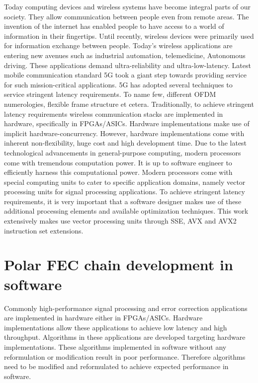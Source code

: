 Today computing devices and wireless systems have become integral parts of our society. They allow communication between people even from remote areas. The invention of the internet has enabled people to have access to a world of information in their fingertips. Until recently, wireless devices were primarily used for information exchange between people. Today's wireless applications are entering new avenues such as industrial automation, telemedicine, Autonomous driving. These applications demand ultra-reliability and ultra-low-latency. Latest mobile communication standard 5G took a giant step towards providing service for such mission-critical applications. 5G has adopted several techniques to service stringent latency requirements. To name few, different OFDM numerologies, flexible frame structure et cetera. Traditionally, to achieve stringent latency requirements wireless communication stacks are implemented in hardware, specifically in FPGAs/ASICs. Hardware implementations make use of implicit hardware-concurrency. However, hardware implementations come with inherent non-flexibility, huge cost and high development time. Due to the latest technological advancements in general-purpose computing, modern processors come with tremendous computation power. It is up to software engineer to efficiently harness this computational power. Modern processors come with special computing units to cater to specific application domains, namely vector processing units for signal processing applications. To achieve stringent latency requirements, it is very important that a software designer makes use of these additional processing elements and available optimization techniques. This work extensively makes use vector processing units through SSE, AVX and AVX2 instruction set extensions.

%
%

\section{Polar FEC chain development in software}
Commonly high-performance signal processing and error correction applications are implemented in hardware either in FPGAs/ASICs. Hardware implementations allow these applications to achieve low latency and high throughput. Algorithms in these applications are developed targeting hardware implementations. These algorithms implemented in software without any reformulation or modification result in poor performance. Therefore algorithms need to be modified and reformulated to achieve expected performance in software. \newline


